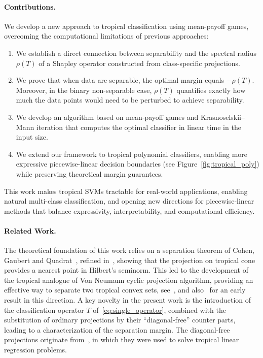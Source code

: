 \documentclass{article}
\begin{document}
\paragraph{Contributions.} We develop a new approach to tropical classification using mean-payoff games,
overcoming the computational limitations of previous approaches:

\begin{enumerate}
    \item We establish a direct connection between separability and the spectral radius $\rho(T)$ of a Shapley operator constructed from class-specific projections.
    
    \item We prove that when data are separable, the optimal margin equals $-\rho(T)$. Moreover, in the binary non-separable case, $\rho(T)$ quantifies exactly how much the data points would need to be perturbed to achieve separability.
    
    \item We develop an algorithm based on mean-payoff games and Krasnoselskii--Mann iteration that computes the optimal classifier in linear time in the input size.
    
    \item We extend our framework to tropical polynomial classifiers, enabling more expressive piecewise-linear decision boundaries (see Figure~\ref{fig:tropical_poly}) while preserving theoretical margin guarantees.
\end{enumerate}

This work makes tropical SVMs tractable for real-world applications, enabling natural multi-class classification, and opening new directions for piecewise-linear methods that balance expressivity, interpretability, and computational efficiency.

\paragraph{Related Work.}
The theoretical foundation of this work relies on a separation theorem of Cohen, Gaubert and Quadrat~\cite{cohen2004}, refined in~\cite{AGNS10},  showing that the projection on tropical cone provides a nearest point in Hilbert's seminorm. This led to the development of the tropical
analogue of Von Neumann cyclic projection algorithm, providing an effective
way to separate two tropical convex sets, see~\cite{gaubert2011}, and also~\cite{CuninghameGreen2003} for an early result
in this direction. A key novelty in the present work is the introduction
of the classification operator $T$ of~\eqref{eq:single_operator}, combined
with the substitution of ordinary projections by their ``diagonal-free'' counter parts,
leading to a characterization of the separation margin. The diagonal-free projections
originate from~\cite{akiangaubertqisaadi},
in which they were used to solve tropical linear regression
problems.
\end{document}
